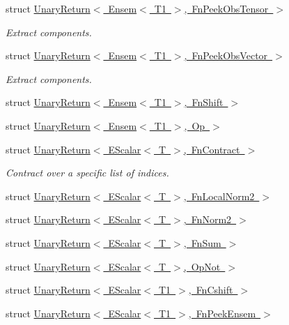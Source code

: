 \begin{DoxyCompactItemize}
struct \mbox{\hyperlink{structENSEM_1_1UnaryReturn_3_01Ensem_3_01T1_01_4_00_01FnPeekObsTensor_01_4}{Unary\+Return$<$ Ensem$<$ T1 $>$, Fn\+Peek\+Obs\+Tensor $>$}}
\begin{DoxyCompactList}\small\item\em Extract components. \end{DoxyCompactList}\item 
struct \mbox{\hyperlink{structENSEM_1_1UnaryReturn_3_01Ensem_3_01T1_01_4_00_01FnPeekObsVector_01_4}{Unary\+Return$<$ Ensem$<$ T1 $>$, Fn\+Peek\+Obs\+Vector $>$}}
\begin{DoxyCompactList}\small\item\em Extract components. \end{DoxyCompactList}\item 
struct \mbox{\hyperlink{structENSEM_1_1UnaryReturn_3_01Ensem_3_01T1_01_4_00_01FnShift_01_4}{Unary\+Return$<$ Ensem$<$ T1 $>$, Fn\+Shift $>$}}
\item 
struct \mbox{\hyperlink{structENSEM_1_1UnaryReturn_3_01Ensem_3_01T1_01_4_00_01Op_01_4}{Unary\+Return$<$ Ensem$<$ T1 $>$, Op $>$}}
\item 
struct \mbox{\hyperlink{structENSEM_1_1UnaryReturn_3_01EScalar_3_01T_01_4_00_01FnContract_01_4}{Unary\+Return$<$ E\+Scalar$<$ T $>$, Fn\+Contract $>$}}
\begin{DoxyCompactList}\small\item\em Contract over a specific list of indices. \end{DoxyCompactList}\item 
struct \mbox{\hyperlink{structENSEM_1_1UnaryReturn_3_01EScalar_3_01T_01_4_00_01FnLocalNorm2_01_4}{Unary\+Return$<$ E\+Scalar$<$ T $>$, Fn\+Local\+Norm2 $>$}}
\item 
struct \mbox{\hyperlink{structENSEM_1_1UnaryReturn_3_01EScalar_3_01T_01_4_00_01FnNorm2_01_4}{Unary\+Return$<$ E\+Scalar$<$ T $>$, Fn\+Norm2 $>$}}
\item 
struct \mbox{\hyperlink{structENSEM_1_1UnaryReturn_3_01EScalar_3_01T_01_4_00_01FnSum_01_4}{Unary\+Return$<$ E\+Scalar$<$ T $>$, Fn\+Sum $>$}}
\item 
struct \mbox{\hyperlink{structENSEM_1_1UnaryReturn_3_01EScalar_3_01T_01_4_00_01OpNot_01_4}{Unary\+Return$<$ E\+Scalar$<$ T $>$, Op\+Not $>$}}
\item 
struct \mbox{\hyperlink{structENSEM_1_1UnaryReturn_3_01EScalar_3_01T1_01_4_00_01FnCshift_01_4}{Unary\+Return$<$ E\+Scalar$<$ T1 $>$, Fn\+Cshift $>$}}
\item 
struct \mbox{\hyperlink{structENSEM_1_1UnaryReturn_3_01EScalar_3_01T1_01_4_00_01FnPeekEnsem_01_4}{Unary\+Return$<$ E\+Scalar$<$ T1 $>$, Fn\+Peek\+Ensem $>$}}

\end{DoxyCompactItemize}
